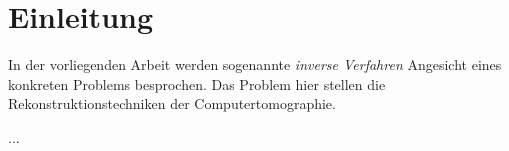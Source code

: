 \chapter*{Einleitung}
\label{cha:1_Einleitung}

In der vorliegenden Arbeit werden sogenannte \textit{inverse Verfahren} Angesicht eines konkreten Problems besprochen. Das Problem hier stellen die Rekonstruktionstechniken der Computertomographie. 

...  



